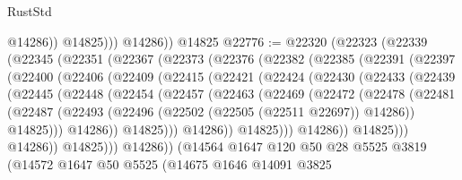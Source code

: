 \begin{lexlean}{RustStd}
\begin{coremodule}
                  @14286))
              @14825)))
        @14286))
    @14825
@22776 := @22320
    (@22323
      (@22339
        (@22345
          (@22351
            (@22367
              (@22373
                (@22376
                  (@22382
                    (@22385
                      (@22391
                        (@22397
                          (@22400
                            (@22406
                              (@22409
                                (@22415
                                  (@22421
                                    (@22424
                                      (@22430
                                        (@22433
                                          (@22439
                                            (@22445
                                              (@22448
                                                (@22454
                                                  (@22457
                                                    (@22463
                                                      (@22469
                                                        (@22472
                                                          (@22478
                                                            (@22481
                                                              (@22487
                                                                (@22493
                                                                  (@22496
                                                                    (@22502
                                                                      (@22505 (@22511 @22697))
                                                                      @14286))
                                                                  @14825)))
                                                            @14286))
                                                        @14825)))
                                                  @14286))
                                              @14825)))
                                        @14286))
                                    @14825)))
                              @14286))
                          @14825)))
                    @14286))
                (@14564
                  @1647
                  @120
                  @50
                  @28
                  @5525
                  @3819
                  (@14572
                    @1647
                    @50
                    @5525
                    (@14675
                      @1646
                      @14091
                      @3825

\end{coremodule}
\end{lexlean}
